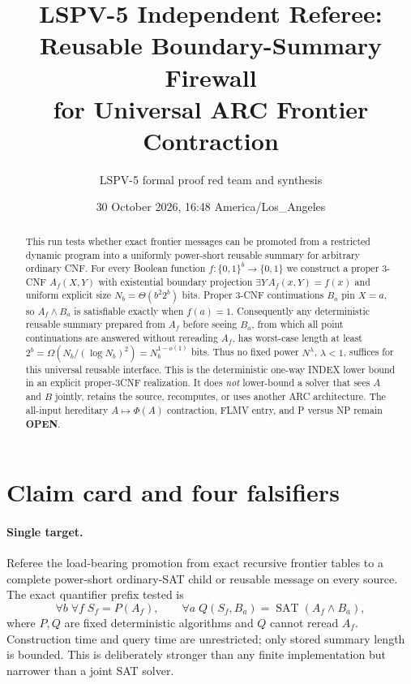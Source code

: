 \documentclass[11pt]{article}
\title{LSPV-5 Independent Referee: Reusable Boundary-Summary Firewall\\
for Universal ARC Frontier Contraction}
\author{LSPV-5 formal proof red team and synthesis}
\date{30 October 2026, 16:48 America/Los\_Angeles}
\newcommand{\OPEN}{\textbf{OPEN}}
\begin{document}
\maketitle

\begin{abstract}
This run tests whether exact frontier messages can be promoted from a restricted
dynamic program into a uniformly power-short reusable summary for arbitrary
ordinary CNF.  For every Boolean function $f:\{0,1\}^b\to\{0,1\}$ we construct
a proper 3-CNF $A_f(X,Y)$ with existential boundary projection
$\exists Y\,A_f(x,Y)=f(x)$ and uniform explicit size
$N_b=\Theta(b^2 2^b)$ bits.  Proper 3-CNF continuations $B_a$ pin $X=a$, so
$A_f\land B_a$ is satisfiable exactly when $f(a)=1$.  Consequently any
deterministic reusable summary prepared from $A_f$ before seeing $B_a$, from
which all point continuations are answered without rereading $A_f$, has
worst-case length at least $2^b=\Omega(N_b/(\log N_b)^2)=N_b^{1-o(1)}$ bits.
Thus no fixed power $N^\lambda$, $\lambda<1$, suffices for this universal
reusable interface.  This is the deterministic one-way INDEX lower bound in an
explicit proper-3CNF realization.  It does \emph{not} lower-bound a solver that
sees $A$ and $B$ jointly, retains the source, recomputes, or uses another ARC
architecture.  The all-input hereditary $A\mapsto\Phi(A)$ contraction, FLMV
entry, and P versus NP remain \OPEN.
\end{abstract}

\section{Claim card and four falsifiers}
\paragraph{Single target.}
Referee the load-bearing promotion from exact recursive frontier tables to a
complete power-short ordinary-SAT child or reusable message on every source.
The exact quantifier prefix tested is
\[
 \forall b\;\forall f\; S_f=P(A_f),\qquad
 \forall a\; Q(S_f,B_a)=\operatorname{SAT}(A_f\land B_a),
\]
where $P,Q$ are fixed deterministic algorithms and $Q$ cannot reread $A_f$.
Construction time and query time are unrestricted; only stored summary length
is bounded.  This is deliberately stronger than any finite implementation but
narrower than a joint SAT solver.
\end{document}
